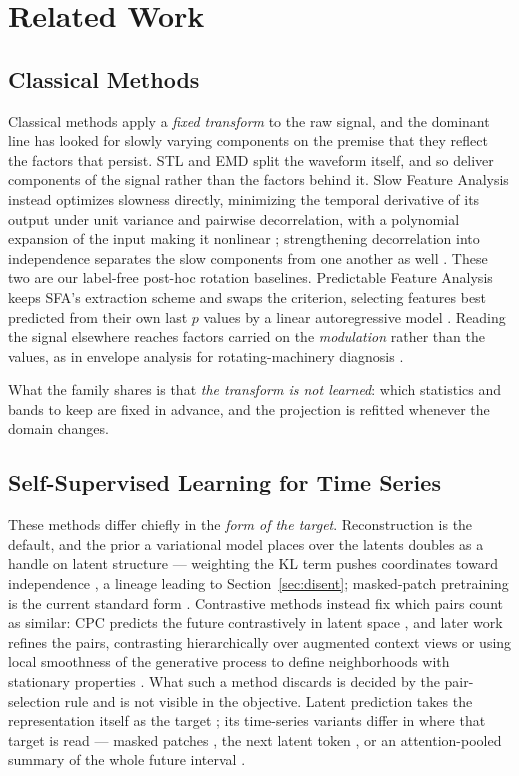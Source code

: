 \section{Related Work}

\subsection{Classical Methods}

Classical methods apply a \emph{fixed transform} to the raw signal, and the dominant line has looked for slowly varying components on the premise that they reflect the factors that persist. STL \citep{cleveland1990} and EMD \citep{huang1998} split the waveform itself, and so deliver components of the signal rather than the factors behind it. Slow Feature Analysis instead optimizes slowness directly, minimizing the temporal derivative of its output under unit variance and pairwise decorrelation, with a polynomial expansion of the input making it nonlinear \citep{wiskott2002}; strengthening decorrelation into independence separates the slow components from one another as well \citep{blaschke2007}. These two are our label-free post-hoc rotation baselines. Predictable Feature Analysis keeps SFA's extraction scheme and swaps the criterion, selecting features best predicted from their own last $p$ values by a linear autoregressive model \citep{richthofer2013}. Reading the signal elsewhere reaches factors carried on the \emph{modulation} rather than the values, as in envelope analysis for rotating-machinery diagnosis \citep{randall2011}.

What the family shares is that \emph{the transform is not learned}: which statistics and bands to keep are fixed in advance, and the projection is refitted whenever the domain changes.

\subsection{Self-Supervised Learning for Time Series}

These methods differ chiefly in the \emph{form of the target}. Reconstruction is the default, and the prior a variational model places over the latents doubles as a handle on latent structure --- weighting the KL term pushes coordinates toward independence \citep{higgins2017}, a lineage leading to Section~\ref{sec:disent}; masked-patch pretraining is the current standard form \citep{nie2023}. Contrastive methods instead fix which pairs count as similar: CPC predicts the future contrastively in latent space \citep{oord2018}, and later work refines the pairs, contrasting hierarchically over augmented context views \citep{yue2022} or using local smoothness of the generative process to define neighborhoods with stationary properties \citep{tonekaboni2021}. What such a method discards is decided by the pair-selection rule and is not visible in the objective. Latent prediction takes the representation itself as the target \citep{lecun2022, assran2023}; its time-series variants differ in where that target is read --- masked patches \citep{ennadir2025}, the next latent token \citep{chemeris2026}, or an attention-pooled summary of the whole future interval \citep{petersen2026}.

